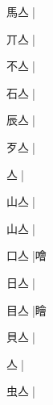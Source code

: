 \begin{multicols}{2}
{{\cjk{}馬亼{\cnjzr{}}}\mktsJzrVerticalBar{}{\cjk{}{\cnsym{}　}{\cnsym{}　}{\cnsym{}　}}|{}\par
{\cjk{}丌亼{\cnjzr{}}}|{}\par
{\cjk{}不亼{\cnjzr{}}}\mktsJzrVerticalBar{}{\cjk{}{\cnsym{}　}{\cnsym{}　}{\cnsym{}　}}|{}\par
{\cjk{}石亼{\cnjzr{}}}\mktsJzrVerticalBar{}{\cjk{}{\cnsym{}　}{\cnsym{}　}{\cnsym{}　}}|{}\par
{\cjk{}辰亼{\cnjzr{}}}\mktsJzrVerticalBar{}{\cjk{}{\cnsym{}　}{\cnsym{}　}{\cnsym{}　}}|{}\par
{\cjk{}歹亼{\cnjzr{}}}\mktsJzrVerticalBar{}{\cjk{}{\cnsym{}　}{\cnsym{}　}{\cnsym{}　}}|{}\par
{亼{\cnjzr{}}}\mktsJzrVerticalBar{}{\cjk{}{\cnsym{}　}{\cnsym{}　}{\cnsym{}　}}|{}\par
{\cjk{}山亼{\cnjzr{}}}\mktsJzrVerticalBar{}{\cjk{}{\cnsym{}　}{\cnsym{}　}{\cnsym{}　}}|{}\par
{\cjk{}山亼{\cnjzr{}}}\mktsJzrVerticalBar{}{\cjk{}{\cnsym{}　}{\cnsym{}　}{\cnsym{}　}}|{}\par
{\cjk{}口亼{\cnjzr{}}}\mktsJzrVerticalBar{}{\cjk{}{\cnsym{}　}{\cnsym{}　}{\cnsym{}　}}|{\cjk{}噲}\par
{\cjk{}日亼{\cnjzr{}}}\mktsJzrVerticalBar{}{\cjk{}{\cnsym{}　}{\cnsym{}　}{\cnsym{}　}}|{}\par
{\cjk{}目亼{\cnjzr{}}}\mktsJzrVerticalBar{}{\cjk{}{\cnsym{}　}{\cnsym{}　}{\cnsym{}　}}|{\cjk{}瞺}\par
{\cjk{}貝亼{\cnjzr{}}}\mktsJzrVerticalBar{}{\cjk{}{\cnsym{}　}{\cnsym{}　}{\cnsym{}　}}|{}\par
{亼{\cnjzr{}}}\mktsJzrVerticalBar{}{\cjk{}{\cnsym{}　}{\cnsym{}　}{\cnsym{}　}}|{}\par
{\cjk{}虫亼{\cnjzr{}}}\mktsJzrVerticalBar{}{\cjk{}{\cnsym{}　}{\cnsym{}　}{\cnsym{}　}}|{}\par
}
\end{multicols}
